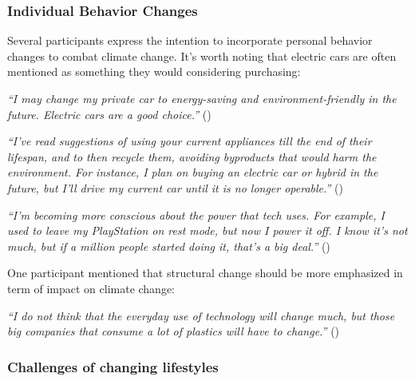     \subsubsection{Individual Behavior Changes}
    
    Several participants express the intention to incorporate personal behavior changes to combat climate change. It's worth noting that electric cars are often mentioned as something they would considering purchasing:
    
    \begin{quoting}
        \textit{``I may change my private car to energy-saving and environment-friendly in the future. Electric cars are a good choice.''} ()
    \end{quoting}

    \begin{quoting}
        \textit{``I've read suggestions of using your current appliances till the end of their lifespan, and to then recycle them, avoiding byproducts that would harm the environment. For instance, I plan on buying an electric car or hybrid in the future, but I'll drive my current car until it is no longer operable.''} ()
    \end{quoting}
    
    \begin{quoting}
        \textit{``I'm becoming more conscious about the power that tech uses. For example, I used to leave my PlayStation on rest mode, but now I power it off. I know it's not much, but if a million people started doing it, that's a big deal.''} () %
    \end{quoting}
    
    
    One participant mentioned that structural change should be more emphasized in term of impact on climate change:
    
    \begin{quoting}
        \textit{``I do not think that the everyday use of technology will change much, but those big companies that consume a lot of plastics will have to change.''} ()
    \end{quoting}
    
    \subsubsection{Challenges of changing lifestyles}
    
